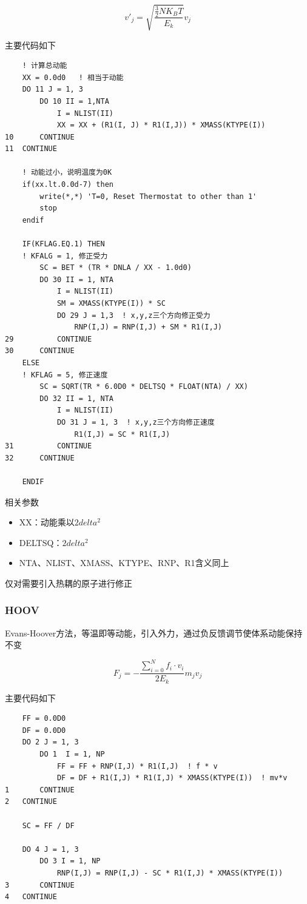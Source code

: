 \documentclass{ctexart}
\begin{document}
\begin{equation}
    v'_{j} = \sqrt{\frac{\frac{3}{2}NK_BT}{E_k}}v_j
\end{equation}

主要代码如下
\begin{verbatim}
    ! 计算总动能
    XX = 0.0d0   ! 相当于动能
    DO 11 J = 1, 3
        DO 10 II = 1,NTA
            I = NLIST(II)
            XX = XX + (R1(I, J) * R1(I,J)) * XMASS(KTYPE(I))
10      CONTINUE
11  CONTINUE

    ! 动能过小，说明温度为0K
    if(xx.lt.0.0d-7) then
        write(*,*) 'T=0, Reset Thermostat to other than 1'
        stop
    endif  

    IF(KFLAG.EQ.1) THEN
    ! KFALG = 1, 修正受力
        SC = BET * (TR * DNLA / XX - 1.0d0)
        DO 30 II = 1, NTA
            I = NLIST(II)
            SM = XMASS(KTYPE(I)) * SC
            DO 29 J = 1,3  ! x,y,z三个方向修正受力
                RNP(I,J) = RNP(I,J) + SM * R1(I,J)
29          CONTINUE
30      CONTINUE
    ELSE
    ! KFLAG = 5, 修正速度
        SC = SQRT(TR * 6.0D0 * DELTSQ * FLOAT(NTA) / XX)
        DO 32 II = 1, NTA
            I = NLIST(II)
            DO 31 J = 1, 3  ! x,y,z三个方向修正速度
                R1(I,J) = SC * R1(I,J)
31          CONTINUE
32      CONTINUE

    ENDIF
\end{verbatim}

\noindent
相关参数

\begin{itemize}
    \item XX：动能乘以$2 delta^2$
    \item DELTSQ：$2 delta^2$
    \item NTA、NLIST、XMASS、KTYPE、RNP、R1含义同上
\end{itemize}

仅对需要引入热耦的原子进行修正

\subsubsection{HOOV}

Evans-Hoover方法，等温即等动能，引入外力，通过负反馈调节使体系动能保持不变

\begin{equation}
    F_j = -\frac{\sum^N_{i=0}f_i\cdot v_i}{2E_k}m_jv_j
\end{equation}

主要代码如下

\begin{verbatim}
    FF = 0.0D0
    DF = 0.0D0
    DO 2 J = 1, 3
        DO 1  I = 1, NP
            FF = FF + RNP(I,J) * R1(I,J)  ! f * v
            DF = DF + R1(I,J) * R1(I,J) * XMASS(KTYPE(I))  ! mv*v
1       CONTINUE
2   CONTINUE

    SC = FF / DF

    DO 4 J = 1, 3
        DO 3 I = 1, NP
            RNP(I,J) = RNP(I,J) - SC * R1(I,J) * XMASS(KTYPE(I))
3       CONTINUE
4   CONTINUE
    
\end{verbatim}
\end{document}
